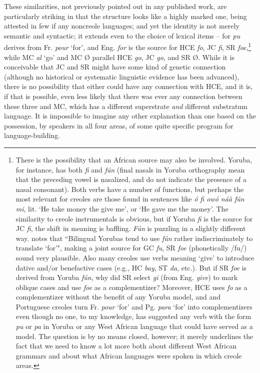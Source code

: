 These similarities, not previously pointed out in any published work, are particularly striking in that the structure looks like a highly marked one, being attested in few if any noncreole languages; and yet the identity is not merely semantic and syntactic; it extends even to the choice of lexical items -- for \textit{pu} derives from Fr. \textit{pour} `for', and Eng. \textit{for} is the source for HCE \textit{fo}, JC \textit{fi}, SR \textit{foe},\footnote{There is the possibility that an African source may also be involved. Yoruba, for instance, has both \textit{fi} and \textit{f{\'u}n} (final nasals in Yoruba orthography mean that the preceding vowel is nasalized, and do not indicate the presence of a nasal consonant). Both verbs have a number of functions, but perhaps the most relevant for creoles are those found in sentences like \textit{{\'o} fi ow{\'o} n\'a\`a f\'un mi}, lit. `He take money the give me', or `He gave me the money'. The similarity to creole instrumentals is obvious, but if Yoruba \textit{fi} is the source for JC \textit{fi}, the shift in meaning is baffling. \textit{F\'un} is puzzling in a slightly different way. \citet{Rowlands1969} notes that ``Bilingual Yorubas tend to use \textit{f\'un} rather indiscriminately to translate `for'", making a joint source for GC \textit{fu}, SR \textit{foe} (phonetically /fu/) sound very plausible. Also many creoles use %
verbs meaning `give' to introduce dative and/or benefactive cases (e.g., HC \textit{bay}, ST \textit{da}, etc.). But if SR \textit{foe} is derived from Yoruba \textit{f\'un}, why did SR select \textit{gi} (from Eng. \textit{give}) to mark oblique cases and use \textit{foe} as a complementizer? Moreover, HCE uses \textit{fo} as a complementizer without the benefit of any Yoruba model, and  and Portuguese creoles turn Fr. \textit{pour} `for' and Pg. \textit{para} `for' into complementizers even though no one, to my knowledge, has suggested any verb with the form \textit{pu} or \textit{pa} in Yoruba or any West African language that could have served as a model. The question is by no means closed, however; it merely underlines the fact that we need to know a lot more both about different West African grammars and about what African lan\-guages were spoken in which creole areas.} while MC \textit{al} `go' and MC {\O} parallel HCE \textit{go}, JC \textit{go}, and SR {\O}. While it is conceivable that JC and SR might have some kind of genetic connection (although no historical or systematic linguistic evidence has been advanced), there is no possi\-bility that either could have any connection with HCE, and it is, if that is possible, even less likely that there was ever any connection between these three and MC, which has a different superstrate \textit{and} different substratum language. It is impossible to imagine any other
explanation than one based on the possession, by speakers in all four areas, of some quite specific program for language-building.

